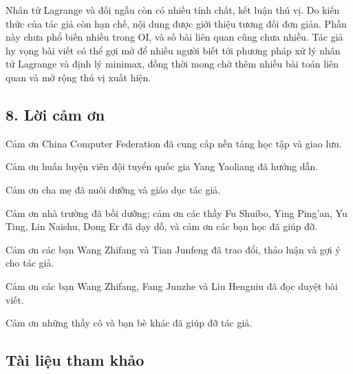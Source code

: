 \documentclass[11pt]{article}
\begin{document}
Nhân tử Lagrange và đối ngẫu còn có nhiều tính chất, kết luận thú vị. Do kiến
thức của tác giả còn hạn chế, nội dung được giới thiệu tương đối đơn giản.
Phần này chưa phổ biến nhiều trong OI, và số bài liên quan cũng chưa nhiều. Tác
giả hy vọng bài viết có thể gợi mở để nhiều người biết tới phương pháp xử lý
nhân tử Lagrange và định lý minimax, đồng thời mong chờ thêm nhiều bài toán
liên quan và mở rộng thú vị xuất hiện.

\subsection*{8. Lời cảm ơn}

Cảm ơn China Computer Federation đã cung cấp nền tảng học tập và giao lưu.

Cảm ơn huấn luyện viên đội tuyển quốc gia Yang Yaoliang đã hướng dẫn.

Cảm ơn cha mẹ đã nuôi dưỡng và giáo dục tác giả.

Cảm ơn nhà trường đã bồi dưỡng; cảm ơn các thầy Fu Shuibo, Ying Ping'an, Yu
Ting, Lin Naishu, Dong Er đã dạy dỗ, và cảm ơn các bạn học đã giúp đỡ.

Cảm ơn các bạn Wang Zhifang và Tian Junfeng đã trao đổi, thảo luận và gợi ý cho
tác giả.

Cảm ơn các bạn Wang Zhifang, Fang Junzhe và Liu Hengniu đã đọc duyệt bài viết.

Cảm ơn những thầy cô và bạn bè khác đã giúp đỡ tác giả.

\subsection*{Tài liệu tham khảo}
\end{document}
